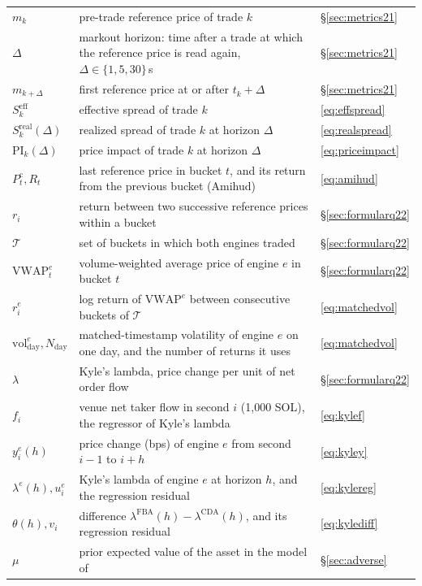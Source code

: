 \begin{longtable}{@{}p{3.3cm} p{10.4cm} p{2.0cm}@{}}
$m_k$ & pre-trade reference price of trade $k$ & \S\ref{sec:metrics21}\\
$\Delta$ & markout horizon: time after a trade at which the reference price is read again, $\Delta \in \{1, 5, 30\}$\,s & \S\ref{sec:metrics21}\\
$m_{k+\Delta}$ & first reference price at or after $t_k + \Delta$ & \S\ref{sec:metrics21}\\
$S^{\mathrm{eff}}_k$ & effective spread of trade $k$ & \eqref{eq:effspread}\\
$S^{\mathrm{real}}_k(\Delta)$ & realized spread of trade $k$ at horizon $\Delta$ & \eqref{eq:realspread}\\
$\mathrm{PI}_k(\Delta)$ & price impact of trade $k$ at horizon $\Delta$ & \eqref{eq:priceimpact}\\
$P^{\mathrm{c}}_t, R_t$ & last reference price in bucket $t$, and its return from the previous bucket (Amihud) & \eqref{eq:amihud}\\
$r_i$ & return between two successive reference prices within a bucket & \S\ref{sec:formularq22}\\
$\mathcal{T}$ & set of buckets in which both engines traded & \S\ref{sec:formularq22}\\
$\mathrm{VWAP}^{e}_t$ & volume-weighted average price of engine $e$ in bucket $t$ & \S\ref{sec:formularq22}\\
$r^{e}_i$ & log return of $\mathrm{VWAP}^{e}$ between consecutive buckets of $\mathcal{T}$ & \eqref{eq:matchedvol}\\
$\mathrm{vol}^{e}_{\text{day}}, N_{\text{day}}$ & matched-timestamp volatility of engine $e$ on one day, and the number of returns it uses & \eqref{eq:matchedvol}\\
$\lambda$ & Kyle's lambda, price change per unit of net order flow & \S\ref{sec:formularq22}\\
$f_i$ & venue net taker flow in second $i$ (1{,}000 SOL), the regressor of Kyle's lambda & \eqref{eq:kylef}\\
$y^{e}_i(h)$ & price change (bps) of engine $e$ from second $i-1$ to $i+h$ & \eqref{eq:kyley}\\
$\lambda^{e}(h), u^{e}_i$ & Kyle's lambda of engine $e$ at horizon $h$, and the regression residual & \eqref{eq:kylereg}\\
$\theta(h), v_i$ & difference $\lambda^{\mathrm{FBA}}(h) - \lambda^{\mathrm{CDA}}(h)$, and its regression residual & \eqref{eq:kylediff}\\
$\mu$ & prior expected value of the asset in the model of \citet{kyle1985continuous} & \S\ref{sec:adverse}\\

\end{longtable}
